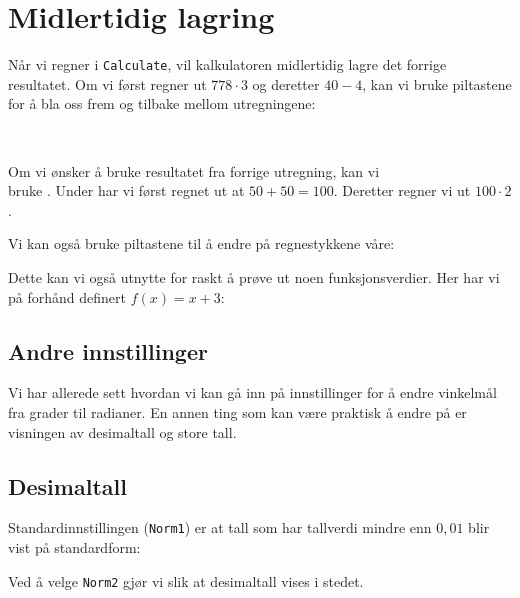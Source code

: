 \section*{Midlertidig lagring}
Når vi regner i \texttt{Calculate}, vil kalkulatoren midlertidig lagre det forrige resultatet. Om vi først regner ut $778\cdot3$ og deretter $40-4$, kan vi bruke piltastene for å bla oss frem og tilbake mellom utregningene:
\begin{figure}
	 \\
\end{figure}
Om vi ønsker å bruke resultatet fra forrige utregning, kan vi\\ bruke . Under har vi først regnet ut at $50+50=100$. Deretter regner vi ut $100\cdot2$.
\begin{figure}
\end{figure}
Vi kan også bruke piltastene til å endre på regnestykkene våre:
\begin{figure}
\end{figure}
Dette kan vi også utnytte for raskt å prøve ut noen funksjonsverdier. Her har vi på forhånd definert $f(x)=x+3$:
\begin{figure}
\end{figure}
\newpage
\subsection{Andre innstillinger}
Vi har allerede sett hvordan vi kan gå inn på innstillinger for å endre vinkelmål fra grader til radianer. En annen ting som kan være praktisk å endre på er visningen av desimaltall og store tall. 
\subsection*{Desimaltall}
Standardinnstillingen (\texttt{Norm1}) er at tall som har tallverdi mindre enn $0,01$ blir vist på standardform: \vs
\begin{figure}
	\centering
\end{figure}
Ved å velge \texttt{Norm2} gjør vi slik at desimaltall vises i stedet.
\begin{figure}
	 \\
	 \\
\end{figure}
